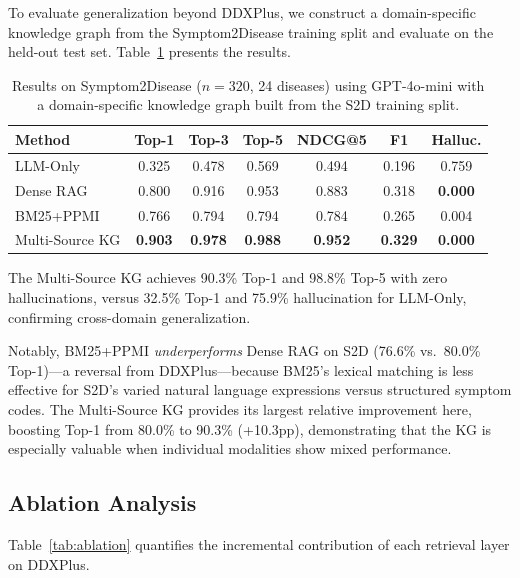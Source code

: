 \documentclass[preprint,12pt]{elsarticle}
\begin{document}
To evaluate generalization beyond DDXPlus, we construct a domain-specific knowledge graph from the Symptom2Disease training split and evaluate on the held-out test set. Table~\ref{tab:s2d} presents the results.

\begin{table}[t]
\centering
\caption{Results on Symptom2Disease ($n{=}320$, 24 diseases) using GPT-4o-mini with a domain-specific knowledge graph built from the S2D training split.}
\label{tab:s2d}
\begin{tabular}{lcccccc}
\toprule
\textbf{Method} & \textbf{Top-1} & \textbf{Top-3} & \textbf{Top-5} & \textbf{NDCG@5} & \textbf{F1} & \textbf{Halluc.} \\
\midrule
LLM-Only       & 0.325 & 0.478 & 0.569 & 0.494 & 0.196 & 0.759 \\
Dense RAG       & 0.800 & 0.916 & 0.953 & 0.883 & 0.318 & \textbf{0.000} \\
BM25+PPMI       & 0.766 & 0.794 & 0.794 & 0.784 & 0.265 & 0.004 \\
Multi-Source KG & \textbf{0.903} & \textbf{0.978} & \textbf{0.988} & \textbf{0.952} & \textbf{0.329} & \textbf{0.000} \\
\bottomrule
\end{tabular}
\end{table}

The Multi-Source KG achieves 90.3\% Top-1 and 98.8\% Top-5 with zero hallucinations, versus 32.5\% Top-1 and 75.9\% hallucination for LLM-Only, confirming cross-domain generalization.

Notably, BM25+PPMI \emph{underperforms} Dense RAG on S2D (76.6\% vs.\ 80.0\% Top-1)---a reversal from DDXPlus---because BM25's lexical matching is less effective for S2D's varied natural language expressions versus structured symptom codes. The Multi-Source KG provides its largest relative improvement here, boosting Top-1 from 80.0\% to 90.3\% (+10.3pp), demonstrating that the KG is especially valuable when individual modalities show mixed performance.

\subsection{Ablation Analysis}
\label{sec:ablation}

Table~\ref{tab:ablation} quantifies the incremental contribution of each retrieval layer on DDXPlus.
\end{document}
